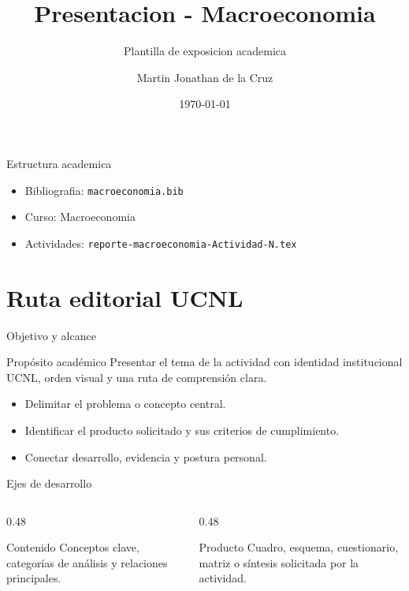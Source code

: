 ﻿\documentclass[spanish,aspectratio=169]{beamer}
\title{Presentacion - Macroeconomia}
\subtitle{Plantilla de exposicion academica}
\author{Martin Jonathan de la Cruz}
\institute{Universidad Ciudadana de Nuevo Leon}
\date{\today}
\begin{document}
\begin{frame}
  \titlepage
\end{frame}

\begin{frame}{Estructura academica}
  \begin{itemize}
    \item Bibliografia: \texttt{macroeconomia.bib}
    \item Curso: Macroeconomia
    \item Actividades: \texttt{reporte-macroeconomia-Actividad-N.tex}
  \end{itemize}
\end{frame}


\section{Ruta editorial UCNL}

\begin{frame}{Objetivo y alcance}
  \begin{block}{Propósito académico}
    Presentar el tema de la actividad con identidad institucional UCNL, orden visual y una ruta de comprensión clara.
  \end{block}
  \begin{itemize}
    \item Delimitar el problema o concepto central.
    \item Identificar el producto solicitado y sus criterios de cumplimiento.
    \item Conectar desarrollo, evidencia y postura personal.
  \end{itemize}
\end{frame}

\begin{frame}{Ejes de desarrollo}
  \begin{columns}[T,totalwidth=\textwidth]
    \begin{column}{0.48\textwidth}
      \begin{block}{Contenido}
        Conceptos clave, categorías de análisis y relaciones principales.
      \end{block}
    \end{column}
    \begin{column}{0.48\textwidth}
      \begin{block}{Producto}
        Cuadro, esquema, cuestionario, matriz o síntesis solicitada por la actividad.
      \end{block}
    \end{column}
  \end{columns}
\end{frame}
\end{document}
